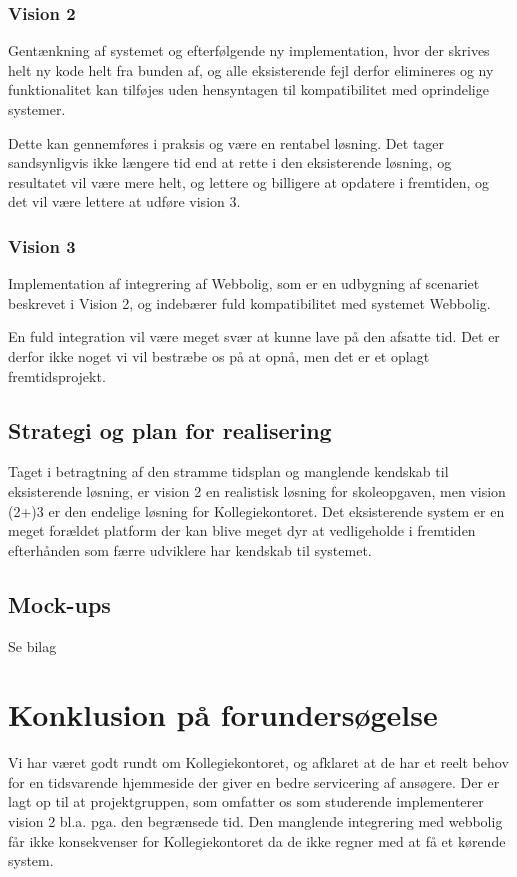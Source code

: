 \documentclass[12pt, a4paper]{report}
\begin{document}
\subsubsection{Vision 2}
Gentænkning af systemet og efterfølgende ny implementation, hvor der skrives helt ny kode helt fra bunden af, og alle eksisterende fejl derfor elimineres og ny funktionalitet kan tilføjes uden hensyntagen til kompatibilitet med oprindelige systemer.

Dette kan gennemføres i praksis og være en rentabel løsning. Det tager sandsynligvis ikke længere tid end at rette i den eksisterende løsning, og resultatet vil være mere helt, og lettere og billigere at opdatere i fremtiden, og det vil være lettere at udføre vision 3.

\subsubsection{Vision 3}
Implementation af integrering af Webbolig, som er en udbygning af scenariet beskrevet i Vision 2, og indebærer fuld kompatibilitet med systemet Webbolig.

En fuld integration vil være meget svær at kunne lave på den afsatte tid. Det er derfor ikke noget vi vil bestræbe os på at opnå, men det er et oplagt fremtidsprojekt.

\subsection{Strategi og plan for realisering}
Taget i betragtning af den stramme tidsplan og manglende kendskab til eksisterende løsning, er vision 2 en realistisk løsning for skoleopgaven, men vision (2+)3 er den endelige løsning for Kollegiekontoret. Det eksisterende system er en meget forældet platform der kan blive meget dyr at vedligeholde i fremtiden efterhånden som færre udviklere har kendskab til systemet.

\subsection{Mock-ups}
Se bilag

\section{Konklusion på forundersøgelse}
Vi har været godt rundt om Kollegiekontoret, og afklaret at de har et reelt behov for en tidsvarende hjemmeside der giver en bedre servicering af ansøgere. Der er lagt op til at projektgruppen, som omfatter os som studerende implementerer vision 2 bl.a. pga. den begrænsede tid. Den manglende integrering med webbolig får ikke konsekvenser for Kollegiekontoret da de ikke regner med at få et kørende system.
\end{document}

